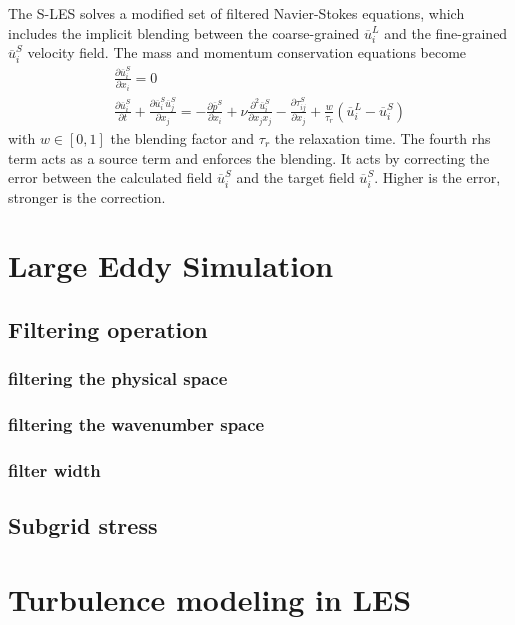 The S-LES solves a modified set of filtered Navier-Stokes equations, which includes the implicit blending between the coarse-grained $\overline{u}_i^{L}$ and the fine-grained $\overline{u}_i^{S}$ velocity field. The mass and momentum conservation equations become
\begin{subequations}\label{subequ: S-LES fitlered Navier-Stokes}
	\begin{gather}
		\frac{\partial \overline{u}_i^S}{\partial x_i} = 0
		\label{equ - S-LES filtered mass}
		\\
		\frac{\partial \overline{u}_i^S}{\partial t}+ \frac{\partial \overline{u}_i^S \overline{u}_j^S}{\partial x_j}=-\frac{\partial \overline{p}^S}{\partial x_i}+\nu \frac{\partial^2 \overline{u}_i^S}{\partial x_{j}x_{j}}-\frac{\partial \tau_{ij}^{S}}{\partial x_j}+\frac{w}{\tau_r} \left( \overline{u}_i^L - \overline{u}_i^S \right)
		\label{equ - S-LES filtered momentum}
	\end{gather}
\end{subequations}
with $w \in [0,1]$ the blending factor and $\tau_r$ the relaxation time. The fourth rhs term acts as a source term and enforces the blending. It acts by correcting the error  between the calculated field $\overline{u}_i^S$ and the target field  $\overline{u}_i^S$. Higher is the error, stronger is the correction.

\section{Large Eddy Simulation}
\label{sec: Large Eddy Simulation}

\subsection{Filtering operation}
\label{subsec: Filtering operation}

\subsubsection{filtering the physical space}
\label{subsubsec: filtering the physical space}

\subsubsection{filtering the wavenumber space}
\label{subsubsec: filtering the wavenumber space}

\subsubsection{filter width}
\label{subsubsec: filter width}

\subsection{Subgrid stress}
\label{subsec: Subgrid stress}

\section{Turbulence modeling in LES}
\label{sec: Turbulence modeling in LES}
